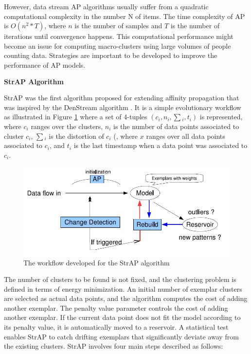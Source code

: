 However, data stream AP algorithms usually suffer from a quadratic computational complexity in the number N of items. The time complexity of AP is $O(n^2*T)$, where $n$ is the number of samples and $T$ is the number of iterations until convergence happens\cite{refianti2017time}. This computational performance might become an issue for computing macro-clusters using large volumes of people counting data. Strategies are important to be developed to improve the performance of AP models.


\textbf{StrAP Algorithm}

StrAP was the first algorithm proposed for extending affinity propagation that was inspired by the DenStream algorithm \cite{zhang2008data}. It is a simple evolutionary workflow as illustrated in Figure \ref{stmodl} where a set of 4-tuples $(c_i,n_i,\sum{_i},t{_i})$ is represented, where  $c_i$ ranges over the clusters, $n_i$ is the number of data points associated to cluster $c_i$, $\sum{_i}$ is the distortion of $c_i$ (, where $x$ ranges over all data points associated to $c_i$, and $t_i$ is the last timestamp when a data point was associated to $c_i$.


\begin{figure}
\centering
\includegraphics[width = 13 cm]{image/Chapters/Chapter3/strapmodel.PNG}
\caption{The workflow developed for the StrAP algorithm }
\label{stmodl}
\end{figure}


The number of clusters to be found is not fixed, and the clustering problem is defined in terms of energy minimization. An initial number of exemplar clusters are selected as actual data points, and the algorithm computes the cost of adding another exemplar. The penalty value parameter controls the cost of adding another exemplar. If the current data point does not fit the model according to its penalty value, it is automatically moved to a reservoir. A statistical test enables StrAP to catch drifting exemplars that significantly deviate away from the existing clusters. StrAP involves four main steps described as follows:  

